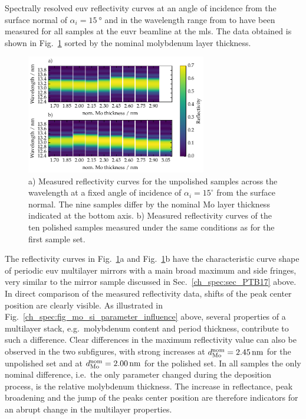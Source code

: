 Spectrally resolved \gls{euv} reflectivity curves at an angle of incidence from the surface normal of $\alpha_i=\SI{15}{\degree}$ and in the wavelength range from  to  have been measured for all samples at the \gls{euvr} beamline at the \gls{mls}. The data obtained is shown in Fig.~\ref{ch_spec:fig_EUV_reflectivity_unpolished_and_polished} sorted by the nominal molybdenum layer thickness.
\begin{figure}[htbp]
\centering
\includegraphics[width=0.7\textwidth]{img/MoSi_EUV_reflectivity}
\caption[Measured EUV reflectivity curves for the polished and unpolished Mo/Si/C samples]{a) Measured reflectivity curves for the unpolished samples across the wavelength at a fixed angle of incidence of $\alpha_i = 15^\circ$ from the surface normal. The nine samples differ by the nominal Mo layer thickness indicated at the bottom axis. b) Measured reflectivity curves of the ten polished samples measured under the same conditions as for the first sample set.}
\label{ch_spec:fig_EUV_reflectivity_unpolished_and_polished}
\end{figure}
The reflectivity curves in Fig.~\ref{ch_spec:fig_EUV_reflectivity_unpolished_and_polished}a and Fig.~\ref{ch_spec:fig_EUV_reflectivity_unpolished_and_polished}b have the characteristic curve shape of periodic \gls{euv} multilayer mirrors with a main broad maximum and side fringes, very similar to the mirror sample discussed in Sec.~\ref{ch_spec:sec_PTB17} above. In direct comparison of the measured reflectivity data, shifts of the peak center position are clearly visible. As illustrated in Fig.~\ref{ch_spec:fig_mo_si_parameter_influence} above, several properties of a multilayer stack, e.g.~molybdenum content and period thickness, contribute to such a difference. Clear differences in the maximum reflectivity value can also be observed in the two subfigures, with strong increases at $d_\text{Mo}^\text{nom} = \nm{2.45}$ for the unpolished set and at $d_\text{Mo}^\text{nom} = \nm{2.00}$ for the polished set. In all samples the only nominal difference, i.e.~the only parameter changed during the deposition process, is the relative molybdenum thickness. The increase in reflectance, peak broadening and the jump of the peaks center position are therefore indicators for an abrupt change in the multilayer properties.

